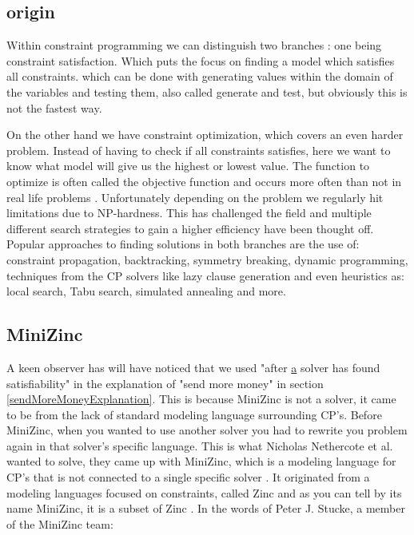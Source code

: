 \subsection{origin}
Within constraint programming we can distinguish two branches \cite{52bartak1999constraint}: one being constraint satisfaction. Which puts the focus on finding a model which satisfies all constraints. which can be done with generating values within the domain of the variables and testing them, also called generate and test, but obviously this is not the fastest way. 

On the other hand we have constraint optimization, which covers an even harder problem. Instead of having to check if all constraints satisfies, here we want to know what model will give us the highest or lowest value. The function to optimize is often called the objective function and occurs more often than not in real life problems \cite{52bartak1999constraint}. 
Unfortunately depending on the problem we regularly hit limitations due to NP-hardness. This has challenged the field and multiple different search strategies to gain a higher efficiency have been thought off. Popular approaches to finding solutions in both branches are the use of: constraint propagation, backtracking, symmetry breaking, dynamic programming, techniques from the CP solvers like lazy clause generation and even heuristics as: local search, Tabu search, simulated annealing and more. 

\subsection{MiniZinc}
A keen observer has will have noticed that we used "after \underline{a} solver has found satisfiability" in the explanation of "send more money" in section \ref{sendMoreMoneyExplanation}. 
This is because MiniZinc is not a solver, it came to be from the lack of standard modeling language surrounding CP's. Before MiniZinc, when you wanted to use another solver you had to rewrite you problem again in that solver's specific language. This is what Nicholas Nethercote et al. wanted to solve, they came up with MiniZinc, which is a modeling language for CP's that is not connected to a single specific solver \cite{57nethercote2007minizinc}. It originated from a modeling languages focused on constraints, called Zinc \cite{68incbanda2006modelling} and as you can tell by its name MiniZinc, it is a subset of Zinc \cite{57nethercote2007minizinc}.
In the words of Peter J. Stucke, a member of the MiniZinc team: 

